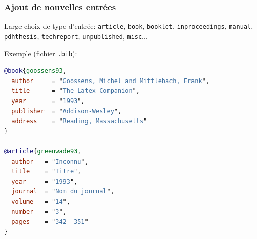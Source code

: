\documentclass{beamer}
\begin{document}


\begin{frame}[fragile]
\frametitle{Ajout de nouvelles entrées}

Large choix de type d'entrée:
\texttt{article}, \texttt{book}, \texttt{booklet}, \texttt{inproceedings},
\texttt{manual}, \texttt{pdhthesis}, \texttt{techreport}, \texttt{unpublished}, \texttt{misc}...

Exemple (fichier \texttt{.bib}):
\begin{lstlisting}[language=BibTeX]
@book{goossens93,
  author     = "Goossens, Michel and Mittlebach, Frank",
  title      = "The Latex Companion",
  year       = "1993",
  publisher  = "Addison-Wesley",
  address    = "Reading, Massachusetts"
}

@article{greenwade93,
  author   = "Inconnu",
  title    = "Titre",
  year     = "1993",
  journal  = "Nom du journal",
  volume   = "14",
  number   = "3",
  pages    = "342--351"
}
\end{lstlisting}
\end{frame}

\end{document}
